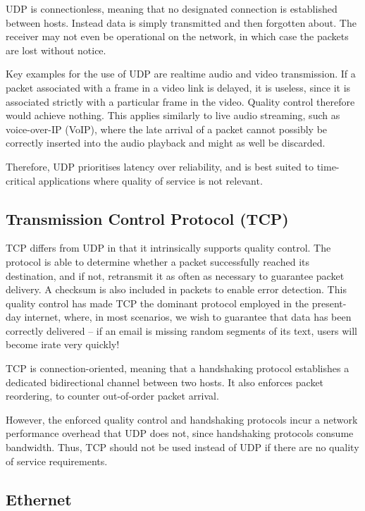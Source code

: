 \documentclass[aps,rmp,twocolumn,amsmath,amssymb,nofootinbib,superscriptaddress,longbibliography,floatfix]{revtex4-1}
\begin{document}
UDP is connectionless, meaning that no designated connection is established between hosts. Instead data is simply transmitted and then forgotten about. The receiver may not even be operational on the network, in which case the packets are lost without notice.

Key examples for the use of UDP are realtime audio and video transmission. If a packet associated with a frame in a video link is delayed, it is useless, since it is associated strictly with a particular frame in the video. Quality control therefore would achieve nothing. This applies similarly to live audio streaming, such as voice-over-IP (VoIP), where the late arrival of a packet cannot possibly be correctly inserted into the audio playback and might as well be discarded.

Therefore, UDP prioritises latency over reliability, and is best suited to time-critical applications where quality of service is not relevant.

%
%

\subsection{Transmission Control Protocol (TCP)} \label{sec:TCP}

TCP differs from UDP in that it intrinsically supports quality control. The protocol is able to determine whether a packet successfully reached its destination, and if not, retransmit it as often as necessary to guarantee packet delivery. A checksum is also included in packets to enable error detection. This quality control has made TCP the dominant protocol employed in the present-day internet, where, in most scenarios, we wish to guarantee that data has been correctly delivered -- if an email is missing random segments of its text, users will become irate very quickly!

TCP is connection-oriented, meaning that a handshaking protocol establishes a dedicated bidirectional channel between two hosts. It also enforces packet reordering, to counter out-of-order packet arrival.

However, the enforced quality control and handshaking protocols incur a network performance overhead that UDP does not, since handshaking protocols consume bandwidth. Thus, TCP should not be used instead of UDP if there are no quality of service requirements.

%
%

\subsection{Ethernet}
\end{document}
